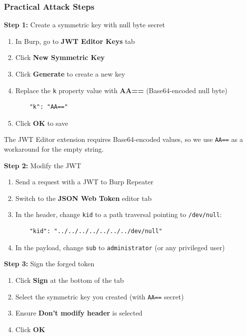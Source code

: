 \documentclass{article}
\begin{document}
\subsubsection{Practical Attack Steps}

\textbf{Step 1:} Create a symmetric key with null byte secret

\begin{enumerate}
    \item In Burp, go to \textbf{JWT Editor Keys} tab
    \item Click \textbf{New Symmetric Key}
    \item Click \textbf{Generate} to create a new key
    \item Replace the \texttt{k} property value with \textbf{AA==} (Base64-encoded null byte)
    \begin{verbatim}
    "k": "AA=="
    \end{verbatim}
    \item Click \textbf{OK} to save
\end{enumerate}

\begin{notebox}[Note]
The JWT Editor extension requires Base64-encoded values, so we use \texttt{AA==} as a workaround for the empty string.
\end{notebox}

\textbf{Step 2:} Modify the JWT

\begin{enumerate}
    \item Send a request with a JWT to Burp Repeater
    \item Switch to the \textbf{JSON Web Token} editor tab
    \item In the header, change \texttt{kid} to a path traversal pointing to \texttt{/dev/null}:
    \begin{verbatim}
    "kid": "../../../../../../../dev/null"
    \end{verbatim}
    \item In the payload, change \texttt{sub} to \texttt{administrator} (or any privileged user)
\end{enumerate}

\textbf{Step 3:} Sign the forged token

\begin{enumerate}
    \item Click \textbf{Sign} at the bottom of the tab
    \item Select the symmetric key you created (with \texttt{AA==} secret)
    \item Ensure \textbf{Don't modify header} is selected
    \item Click \textbf{OK}
\end{enumerate}
\end{document}
